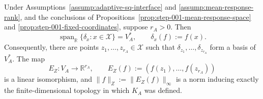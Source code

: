 \begin{lemma}
\label{lem:step-002-evaluation-coordinates}
Under Assumptions~\ref{assump:adaptive-sq-interface} and
\ref{assump:mean-response-rank}, and the conclusions of
Propositions~\ref{prop:step-001-mean-response-space} and
\ref{prop:step-001-fixed-coordinates}, suppose \(r_A>0\).  Then
\[
\operatorname{span}_{\mathbb R}\{\delta_x:x\in\mathcal X\}=V_A^*,
\qquad \delta_x(f):=f(x).
\]
Consequently, there are points \(z_1,\ldots,z_{r_A}\in\mathcal X\) such that
\(\delta_{z_1},\ldots,\delta_{z_{r_A}}\) form a basis of \(V_A^*\).  The map
\[
E_Z:V_A\to\mathbb R^{r_A},
\qquad E_Z(f):=(f(z_1),\ldots,f(z_{r_A}))
\]
is a linear isomorphism, and
\(\|f\|_Z:=\|E_Z(f)\|_\infty\) is a norm inducing exactly the
finite-dimensional topology in which \(K_A\) was defined.
\end{lemma}

